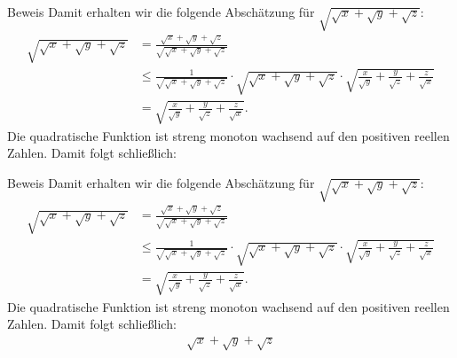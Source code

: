 \documentclass[10pt]{beamer}
\begin{document}
\begin{frame}{Beweis}
    Damit erhalten wir die folgende Abschätzung für \( \sqrt{\sqrt{x} + \sqrt{y} + \sqrt{z}} \):
    \begin{align*}
        \sqrt{\sqrt{x} + \sqrt{y} + \sqrt{z}}
        & = \frac{ \sqrt{x} + \sqrt{y} + \sqrt{z}}{\sqrt{\sqrt{x} + \sqrt{y} + \sqrt{z}}} \\
        & \leq \frac{1}{\sqrt{\sqrt{x} + \sqrt{y} + \sqrt{z}}} \cdot \sqrt{\sqrt{x} + \sqrt{y} + \sqrt{z}} \cdot \sqrt{\frac{x}{\sqrt{y}} + \frac{y}{\sqrt{z}} + \frac{z}{\sqrt{x}}} \\
        & = \sqrt{\frac{x}{\sqrt{y}} + \frac{y}{\sqrt{z}} + \frac{z}{\sqrt{x}}}.
    \end{align*}
    Die quadratische Funktion ist streng monoton wachsend auf den positiven reellen Zahlen. Damit folgt schließlich:
\end{frame}



\begin{frame}{Beweis}
    Damit erhalten wir die folgende Abschätzung für \( \sqrt{\sqrt{x} + \sqrt{y} + \sqrt{z}} \):
    \begin{align*}
        \sqrt{\sqrt{x} + \sqrt{y} + \sqrt{z}}
        & = \frac{ \sqrt{x} + \sqrt{y} + \sqrt{z}}{\sqrt{\sqrt{x} + \sqrt{y} + \sqrt{z}}} \\
        & \leq \frac{1}{\sqrt{\sqrt{x} + \sqrt{y} + \sqrt{z}}} \cdot \sqrt{\sqrt{x} + \sqrt{y} + \sqrt{z}} \cdot \sqrt{\frac{x}{\sqrt{y}} + \frac{y}{\sqrt{z}} + \frac{z}{\sqrt{x}}} \\
        & = \sqrt{\frac{x}{\sqrt{y}} + \frac{y}{\sqrt{z}} + \frac{z}{\sqrt{x}}}.
    \end{align*}
    Die quadratische Funktion ist streng monoton wachsend auf den positiven reellen Zahlen. Damit folgt schließlich:
    \begin{align*}
         \sqrt{x} + \sqrt{y} + \sqrt{z}
    \end{align*}
\end{frame}
\end{document}
